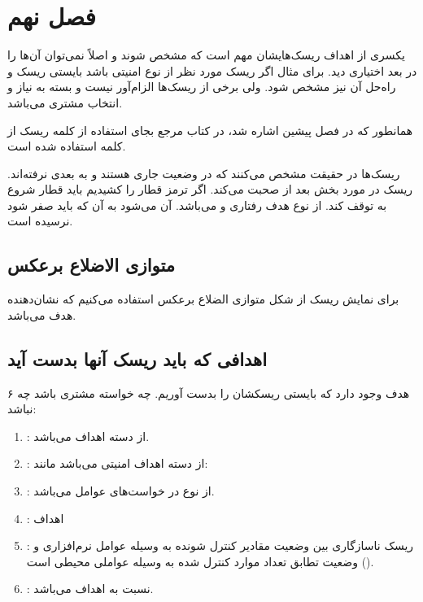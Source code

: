 \newpage

\section{فصل نهم}

یکسری از اهداف ریسک‌هایشان مهم است که مشخص شوند و اصلاً نمی‌توان آن‌ها را در بعد
اختیاری دید. برای مثال اگر ریسک مورد نظر از نوع امنیتی باشد بایستی ریسک و راه‌حل
آن نیز مشخص شود. ولی برخی از ریسک‌ها الزام‌آور نیست و بسته به نیاز و انتخاب
مشتری می‌باشد.

همانطور که در فصل پیشین اشاره شد، در کتاب مرجع بجای استفاده از کلمه ریسک از کلمه
 استفاده شده است.

ریسک‌ها در حقیقت مشخص می‌کنند که در وضعیت جاری هستند و به  بعدی
نرفته‌اند. ریسک در مورد بخش بعد از  صحبت می‌کند. اگر ترمز قطار را
کشیدیم باید قطار شروع به توقف کند. از نوع هدف رفتاری و  می‌باشد.
 آن می‌شود به آن  که باید صفر شود نرسیده است.

\subsection{متوازی الاضلاع برعکس}

برای نمایش ریسک از شکل متوازی الضلاع برعکس استفاده می‌کنیم که نشان‌دهنده
 هدف می‌باشد.

\subsection{اهدافی که باید ریسک آنها بدست آید}

۶ هدف وجود دارد که بایستی ریسکشان را بدست آوریم. چه خواسته مشتری باشد چه نباشد:

\begin{enumerate}
    \item {}: از دسته اهداف  می‌باشد.
    \item {}: از دسته اهداف امنیتی می‌باشد مانند: 
    \item {}: از نوع در خواست‌های عوامل 
    می‌باشد.
    \item {}: اهداف 
    \item {}: ریسک ناسازگاری بین وضعیت مقادیر کنترل شونده به وسیله
    عوامل نرم‌افزاری و وضعیت تطابق تعداد موارد کنترل شده به وسیله عواملی محیطی
    است ().
    \item {}: نسبت به اهداف  می‌باشد.
\end{enumerate}